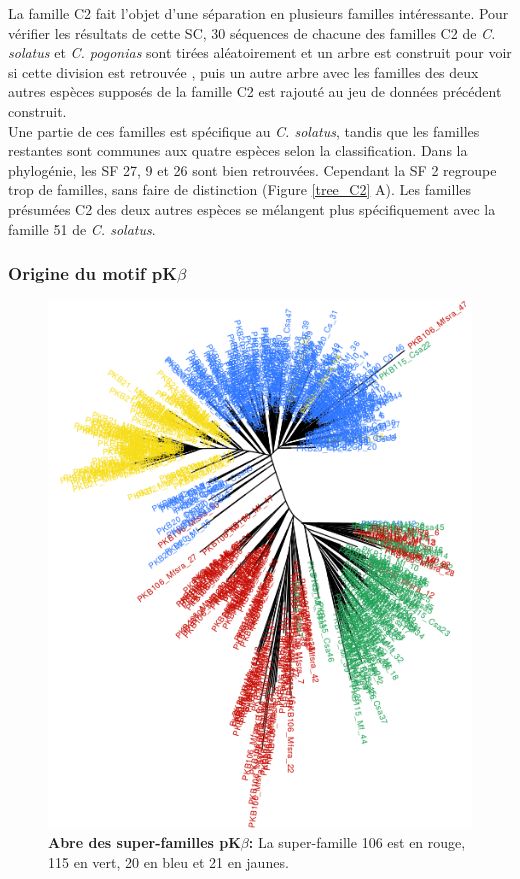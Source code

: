 \documentclass[12pt,a4paper]{article}
\begin{document}
		La famille C2 fait l'objet d'une séparation en plusieurs familles intéressante. Pour vérifier les résultats de cette SC, 30 séquences de chacune des familles C2 de \textit{C. solatus} et \textit{C. pogonias} sont tirées aléatoirement et un arbre est construit pour voir si cette division est retrouvée , puis un autre arbre avec les familles des deux autres espèces supposés de la famille C2 est rajouté au jeu de données précédent construit.\\
		Une partie de ces familles est spécifique au \textit{C. solatus}, tandis que les familles restantes sont communes aux quatre espèces selon la classification. Dans la phylogénie, les SF 27, 9 et 26 sont bien retrouvées. Cependant la SF 2 regroupe trop de familles, sans faire de distinction (Figure \ref{tree_C2} A). Les familles présumées C2 des deux autres espèces se mélangent plus spécifiquement avec la famille 51 de \textit{C. solatus}.							
	\subsubsection{Origine du motif pK$\beta$}
		\begin{figure}	
			\centering
				\includegraphics[scale=0.4, angle =90]{img/pkb_tree.png}				
				\caption{\textbf{Abre des super-familles pK$\beta$:} La super-famille 106 est en rouge, 115 en vert, 20 en bleu et 21 en jaunes.
	\label{fig:pkb_tree}} 
\end{figure}
\end{document}
